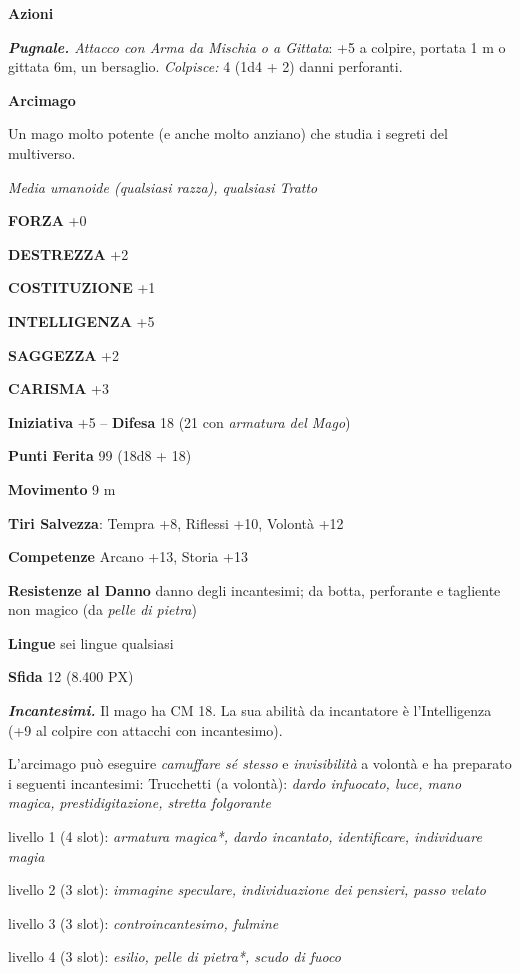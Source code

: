 \begin{multicols}{2}
	\textbf{Azioni}

	\textit{\textbf{Pugnale.} Attacco con Arma da Mischia o a Gittata}: +5 a colpire, portata 1 m o gittata 6m, un bersaglio. \textit{Colpisce:} 4 (1d4 + 2) danni perforanti.

	\medskip\textbf{Arcimago}

	Un mago molto potente (e anche molto anziano) che studia i segreti del multiverso.

	\textit{Media umanoide (qualsiasi razza), qualsiasi Tratto}

	\textbf{FORZA} +0

	\textbf{DESTREZZA} +2

	\textbf{COSTITUZIONE} +1

	\textbf{INTELLIGENZA} +5

	\textbf{SAGGEZZA} +2

	\textbf{CARISMA} +3

	\textbf{Iniziativa} +5 -- \textbf{Difesa} 18 (21 con \textit{armatura del Mago})

	\textbf{Punti Ferita} 99 (18d8 + 18)

	\textbf{Movimento} 9 m

	\textbf{Tiri Salvezza}: Tempra +8, Riflessi +10, Volontà +12

	\textbf{Competenze} Arcano +13, Storia +13

	\textbf{Resistenze al Danno} danno degli incantesimi; da botta, perforante e tagliente non magico (da \textit{pelle di pietra})

	\textbf{Lingue} sei lingue qualsiasi

	\textbf{Sfida} 12 (8.400 PX)

	\textit{\textbf{Incantesimi.}} Il mago ha CM 18. La sua abilità da incantatore è l'Intelligenza (+9 al colpire con attacchi con incantesimo).

	L'arcimago può eseguire \textit{camuffare sé stesso} e \textit{invisibilità} a volontà e ha preparato i seguenti incantesimi: Trucchetti (a volontà): \textit{dardo infuocato, luce, mano magica,}
	\textit{prestidigitazione, stretta folgorante}

	livello 1 (4 slot): \textit{armatura magica*, dardo incantato, identificare, individuare magia}

	livello 2 (3 slot): \textit{immagine speculare, individuazione dei pensieri, passo velato}

	livello 3 (3 slot): \textit{controincantesimo, fulmine}

	livello 4 (3 slot): \textit{esilio, pelle di pietra*, scudo di fuoco}


\end{multicols}
